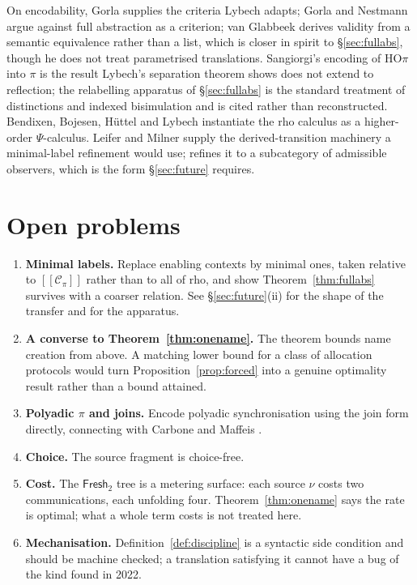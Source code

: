 \documentclass[11pt]{article}
\theoremstyle{definition}
\theoremstyle{plain}
\theoremstyle{remark}
\newcommand{\enc}[1]{[\![#1]\!]}
\newcommand{\Frsh}{\mathsf{Fresh}_2}
\newcommand{\Ctx}{\mathscr{C}}
\begin{document}
On encodability, Gorla \cite{Gorla10} supplies the criteria Lybech
adapts; Gorla and Nestmann \cite{GorlaNestmann14} argue against full
abstraction as a criterion; van Glabbeek \cite{Glabbeek18} derives
validity from a semantic equivalence rather than a list, which is closer
in spirit to \S\ref{sec:fullabs}, though he does not treat parametrised
translations. Sangiorgi's encoding of HO$\pi$ into $\pi$
\cite{Sangiorgi93} is the result Lybech's separation theorem shows does
not extend to reflection; the relabelling apparatus of
\S\ref{sec:fullabs} is the standard treatment of distinctions and indexed
bisimulation \cite{SangiorgiWalker01} and is cited rather than
reconstructed. Bendixen, Bojesen, H\"uttel and Lybech \cite{Psi}
instantiate the rho calculus as a higher-order $\Psi$-calculus. Leifer
and Milner \cite{LeiferMilner00} supply the derived-transition machinery
a minimal-label refinement would use; \cite{BIHOL} refines it to a
subcategory of admissible observers, which is the form \S\ref{sec:future}
requires.

\section{Open problems}\label{sec:open}

\begin{enumerate}[label=\arabic*.,leftmargin=2.2em]
\item \textbf{Minimal labels.} Replace enabling contexts by minimal
ones, taken relative to $\enc{\Ctx_\pi}$ rather than to all of rho, and
show Theorem~\ref{thm:fullabs} survives with a coarser relation. See
\S\ref{sec:future}(ii) for the shape of the transfer and \cite{BIHOL}
for the apparatus.
\item \textbf{A converse to Theorem~\ref{thm:onename}.} The theorem
bounds name creation from above. A matching lower bound for a class of
allocation protocols would turn Proposition~\ref{prop:forced} into a
genuine optimality result rather than a bound attained.
\item \textbf{Polyadic $\pi$ and joins.} Encode polyadic synchronisation
using the join form directly, connecting with Carbone and Maffeis
\cite{CarboneMaffeis03}.
\item \textbf{Choice.} The source fragment is choice-free.
\item \textbf{Cost.} The $\Frsh$ tree is a metering surface: each source
$\nu$ costs two communications, each unfolding four.
Theorem~\ref{thm:onename} says the rate is optimal; what a whole term
costs is not treated here.
\item \textbf{Mechanisation.} Definition~\ref{def:discipline} is a
syntactic side condition and should be machine checked; a translation
satisfying it cannot have a bug of the kind found in 2022.
\end{enumerate}
\end{document}
